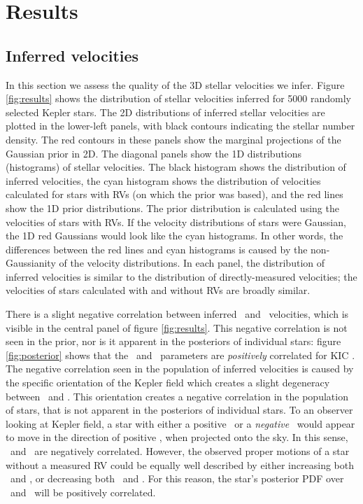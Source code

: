 \section{Results}
\label{sec:results}

\subsection{Inferred velocities}

In this section we assess the quality of the 3D stellar velocities we infer.
Figure \ref{fig:results} shows the distribution of stellar velocities inferred
for 5000 randomly selected Kepler stars.
The 2D distributions of inferred stellar velocities are plotted in the
lower-left panels, with black contours indicating the stellar number density.
The red contours in these panels show the marginal projections of the
Gaussian prior in 2D.
The diagonal panels show the 1D distributions (histograms) of stellar
velocities.
The black histogram shows the distribution of inferred velocities, the cyan
histogram shows the distribution of velocities calculated for stars with RVs
(on which the prior was based), and the red lines show the 1D prior
distributions.
The prior distribution is calculated using the velocities of stars with RVs.
If the velocity distributions of stars were Gaussian, the 1D red Gaussians
would look like the cyan histograms.
In other words, the differences between the red lines and cyan histograms
is caused by the non-Gaussianity of the velocity distributions.
In each panel, the distribution of inferred velocities is similar to the
distribution of directly-measured velocities; the velocities of stars
calculated with and without RVs are broadly similar.

There is a slight negative correlation between inferred \vy\ and \vz\
velocities, which is visible in the central panel of figure \ref{fig:results}.
This negative correlation is not seen in the prior, nor is it apparent in the
posteriors of individual stars: figure \ref{fig:posterior} shows that the \vy\
and \vz\ parameters are {\it positively} correlated for KIC \kicstar.
The negative correlation seen in the population of inferred velocities is
caused by the specific orientation of the Kepler field which creates a slight
degeneracy between \vy\ and \vz.
This orientation creates a negative correlation in the population of stars,
that is not apparent in the posteriors of individual stars.
To an observer looking at Kepler field, a star with either a positive \vz\ or
a {\it negative} \vy\ would appear to move in the direction of positive \vz,
when projected onto the sky.
In this sense, \vy\ and \vz\ are negatively correlated.
However, the observed proper motions of a star without a measured RV could be
equally well described by either increasing both \vy\ and \vz, or decreasing
both \vy\ and \vz.
For this reason, the star's posterior PDF over \vy\ and \vz\ will be
positively correlated.

